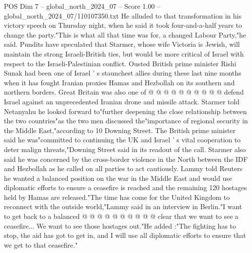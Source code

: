 \begin{textsample}{POS Dim 7 – global\_north\_2024\_07 – Score 1.00 – global\_north\_2024\_07/110107350.txt}
He alluded to that transformation in his victory speech on Thursday night, when he said it took four-and-a-half years to change the party."This is what all that time was for, a changed Labour Party,"he said.
Pundits have speculated that Starmer, whose wife Victoria is Jewish, will maintain the strong Israeli-British ties, but would be more critical of Israel with respect to the Israeli-Palestinian conflict.
Ousted British prime minister Rishi Sunak had been one of Israel ' s staunchest allies during these last nine months when it has fought Iranian proxies Hamas and Hezbollah on its southern and northern borders.
Great Britain was also one of @ @ @ @ @ @ @ @ @ @ defend Israel against an unprecedented Iranian drone and missile attack.
Starmer told Netanyahu he looked forward to"further deepening the close relationship between the two countries"as the two men discussed the"importance of regional security in the Middle East,"according to 10 Downing Street.
The British prime minister said he was"committed to continuing the UK and Israel ' s vital cooperation to deter malign threats,"Downing Street said in its readout of the call.
Starmer also said he was concerned by the cross-border violence in the North between the IDF and Hezbollah as he called on all parties to act cautiously.
Lammy told Reuters he wanted a balanced position on the war in the Middle East and would use diplomatic efforts to ensure a ceasefire is reached and the remaining 120 hostages held by Hamas are released."The time has come for the United Kingdom to reconnect with the outside world,"Lammy said in an interview in Berlin."I want to get back to a balanced @ @ @ @ @ @ @ @ @ @ clear that we want to see a ceasefire...
We want to see those hostages out."He added :"The fighting has to stop, the aid has got to get in, and I will use all diplomatic efforts to ensure that we get to that ceasefire."

\end{textsample}
